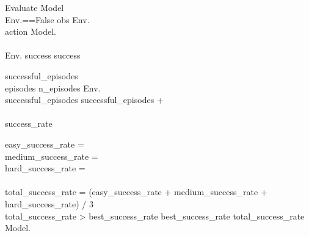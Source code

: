 \renewcommand{\thepseudonum}{\roman{pseudonum}}
\begin{pseudocode}{Evaluate Model}{ }
\\

\WHILE Env.==False \DO
\BEGIN
obs \GETS Env.\\
action \GETS Model.\\
\END\\
\IF Env. \THEN
success 
\ELSE
success \\
\ENDPROCEDURE

successful\_episodes \\
\FOR episodes  \TO n\_episodes \DO
\BEGIN
Env.\\
successful\_episodes \GETS successful\_episodes + \\
\END\\
success\_rate \GETS {}\\
\ENDPROCEDURE

easy\_success\_rate = \\
medium\_success\_rate = \\
hard\_success\_rate = \\
\\
total\_success\_rate = (easy\_success\_rate + medium\_success\_rate + hard\_success\_rate) / 3\\
\IF total\_success\_rate > best\_success\_rate \THEN
\BEGIN
best\_success\_rate \GETS total\_success\_rate\\
Model.\\
\END
\ENDPROCEDURE
\end{pseudocode}

